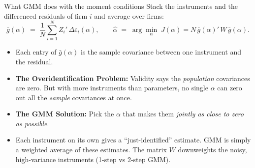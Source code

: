 \documentclass[
  11pt,
  ignorenonframetext,
  aspectratio=169,
]{beamer}
\providecommand{\tightlist}{%
  \setlength{\itemsep}{0pt}\setlength{\parskip}{0pt}}
\begin{document}
\begin{frame}{What GMM does with the moment conditions}
\protect{}\label{what-gmm-does-with-the-moment-conditions}
Stack the instruments and the differenced residuals of firm \(i\) and
average over firms: \[
\bar g(\alpha) \;=\; \frac{1}{N}\sum_{i=1}^N Z_i'\,\Delta\varepsilon_i(\alpha), \qquad
\hat\alpha \;=\; \arg\min_\alpha\; J(\alpha) = N\,\bar g(\alpha)'\,W\,\bar g(\alpha).
\]

\begin{itemize}
\tightlist
\item
  Each entry of \(\bar g(\alpha)\) is the sample covariance between one
  instrument and the residual.
\item
  \textbf{The Overidentification Problem:} Validity says the
  \emph{population} covariances are zero. But with more instruments than
  parameters, no single \(\alpha\) can zero out all the \emph{sample}
  covariances at once.
\item
  \textbf{The GMM Solution:} Pick the \(\alpha\) that makes them
  \emph{jointly as close to zero as possible}.
\item
  Each instrument on its own gives a ``just-identified'' estimate. GMM
  is simply a weighted average of these estimates. The matrix \(W\)
  downweights the noisy, high-variance instruments (1-step vs 2-step
  GMM).
\end{itemize}
\end{frame}
\end{document}
